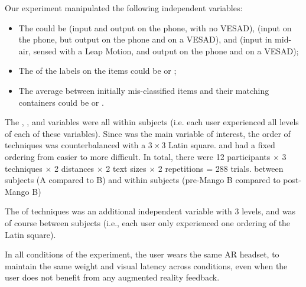 Our experiment manipulated the following independent variables:

\begin{itemize}
 \item The  could be  (input and output on the phone, with no VESAD),  (input on the phone, but output on the phone and on a VESAD), and  (input in mid-air, sensed with a Leap Motion, and output on the phone and on a VESAD);
 \item The  of the labels on the items could be  or ;
 \item The average  between initially mis-classified items and their matching containers could be  or .
\end{itemize}

The , , and  variables were all within subjects (i.e. each user experienced all levels of each of these variables). Since  was the main variable of interest, the order of techniques was counterbalanced with a $3 \times 3$ Latin square.  and  had a fixed ordering from easier to more difficult. In total, there were 12 participants $\times$ 3 techniques $\times$ 2 distances $\times$ 2 text sizes $\times$ 2 repetitions = 288 trials.
between subjects (A compared to B) and within subjects (pre-Mango B compared to post-Mango B)

The  of techniques was an additional independent variable with 3 levels, and was of course between subjects (i.e., each user only experienced one ordering of the Latin square).

In all conditions of the experiment, the user wears the same AR headset, to maintain the same weight and visual latency across conditions, even when the user does not benefit from any augmented reality feedback.


